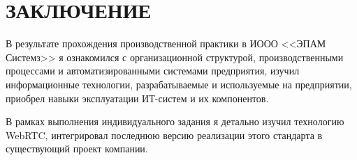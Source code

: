 \section*{ЗАКЛЮЧЕНИЕ}

В результате прохождения производственной практики в ИООО <<ЭПАМ Системз>> я ознакомился с
организационной структурой, производственными процессами и автоматизированными системами предприятия,
изучил информационные технологии, разрабатываемые и используемые на предприятии,
приобрел навыки эксплуатации ИТ-систем и их компонентов.

В рамках выполнения индивидуального задания я детально изучил технологию WebRTC,
интегрировал последнюю версию реализации этого стандарта в существующий проект компании.